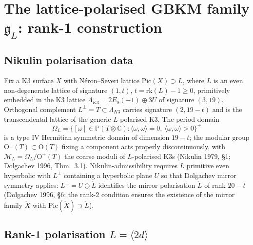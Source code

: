 \providecommand{\K}{\mathbf{k}}
\providecommand{\Z}{\mathbb{Z}}
\providecommand{\Q}{\mathbb{Q}}
\providecommand{\C}{\mathbb{C}}
\providecommand{\HH}{\mathbb{H}}
\providecommand{\gfrak}{\mathfrak{g}}
\providecommand{\hfrak}{\mathfrak{h}}
\providecommand{\Pic}{\mathrm{Pic}}
\providecommand{\Sig}{\mathrm{sign}}
\providecommand{\Om}{\Omega}
\providecommand{\disc}{\mathrm{disc}}
\providecommand{\rk}{\mathrm{rk}}
\providecommand{\Aut}{\mathrm{Aut}}
\providecommand{\Oneg}{\mathrm{O}^+}
\providecommand{\Jac}{J_{\mathrm{cusp}}}

\section*{The lattice-polarised GBKM family $\gfrak_L$: rank-1 construction}

\subsection*{Nikulin polarisation data}

Fix a K3 surface $X$ with N\'eron--Severi lattice $\Pic(X) \supset L$, where $L$ is an
even non-degenerate lattice of signature $(1, t)$, $t = \rk(L) - 1 \geq 0$,
primitively embedded in the K3 lattice
$\Lambda_{K3} = 2 E_8(-1) \oplus 3 U$ of signature $(3, 19)$. Orthogonal complement
$L^\perp = T \subset \Lambda_{K3}$ carries signature $(2, 19 - t)$ and is the
transcendental lattice of the generic $L$-polarised K3. The period domain
\[
 \Om_L = \{ [\omega] \in \mathbb{P}(T \otimes \C) : \langle \omega, \omega \rangle = 0,\ \langle \omega, \bar\omega \rangle > 0 \}^+
\]
is a type IV Hermitian symmetric domain of dimension $19 - t$; the modular group
$\Oneg(T) \subset \mathrm{O}(T)$ fixing a component acts properly discontinuously, with
$\mathcal{M}_L = \Om_L / \Oneg(T)$ the coarse moduli of $L$-polarised K3s
(Nikulin 1979, \S1; Dolgachev 1996, Thm.~3.1). Nikulin-admissibility requires
$L$ primitive even hyperbolic with $L^\perp$ containing a hyperbolic plane $U$
so that Dolgachev mirror symmetry applies: $L^\perp = U \oplus \check L$ identifies
the mirror polarisation $\check L$ of rank $20 - t$
(Dolgachev 1996, \S6; the rank-2 condition ensures the existence of the mirror
family $\check X$ with $\Pic(\check X) \supset \check L$).

\subsection*{Rank-1 polarisation $L = \langle 2d \rangle$}

